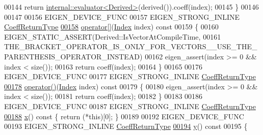 \begin{DoxyCode}
00144       \textcolor{keywordflow}{return} \hyperlink{struct_eigen_1_1internal_1_1evaluator}{internal::evaluator<Derived>}(derived()).coeff(index);
00145     \}
00146 
00147 
00156     EIGEN\_DEVICE\_FUNC
00157     EIGEN\_STRONG\_INLINE \hyperlink{class_eigen_1_1internal_1_1_tensor_lazy_evaluator_writable}{CoeffReturnType}
\hyperlink{group___core___module_ad26422dfa7b2bf859d4304663c36de10}{00158}     \hyperlink{group___core___module_ad26422dfa7b2bf859d4304663c36de10}{operator[]}(\hyperlink{group___core___module_a554f30542cc2316add4b1ea0a492ff02}{Index} index)\textcolor{keyword}{ const}
00159 \textcolor{keyword}{    }\{
00160       EIGEN\_STATIC\_ASSERT(Derived::IsVectorAtCompileTime,
00161                           THE\_BRACKET\_OPERATOR\_IS\_ONLY\_FOR\_VECTORS\_\_USE\_THE\_PARENTHESIS\_OPERATOR\_INSTEAD)
00162       eigen\_assert(index >= 0 && index < size());
00163       \textcolor{keywordflow}{return} coeff(index);
00164     \}
00165 
00176     EIGEN\_DEVICE\_FUNC
00177     EIGEN\_STRONG\_INLINE \hyperlink{class_eigen_1_1internal_1_1_tensor_lazy_evaluator_writable}{CoeffReturnType}
\hyperlink{group___core___module_a679c7e69917baa1abf2c2f82725ae470}{00178}     \hyperlink{group___core___module_a679c7e69917baa1abf2c2f82725ae470}{operator()}(\hyperlink{group___core___module_a554f30542cc2316add4b1ea0a492ff02}{Index} index)\textcolor{keyword}{ const}
00179 \textcolor{keyword}{    }\{
00180       eigen\_assert(index >= 0 && index < size());
00181       \textcolor{keywordflow}{return} coeff(index);
00182     \}
00183 
00186     EIGEN\_DEVICE\_FUNC
00187     EIGEN\_STRONG\_INLINE \hyperlink{class_eigen_1_1internal_1_1_tensor_lazy_evaluator_writable}{CoeffReturnType}
\hyperlink{group___core___module_a36fb246141b6ea5ab5289d7eb6afdf6e}{00188}     \hyperlink{group___core___module_a36fb246141b6ea5ab5289d7eb6afdf6e}{x}()\textcolor{keyword}{ const }\{ \textcolor{keywordflow}{return} (*\textcolor{keyword}{this})[0]; \}
00189 
00192     EIGEN\_DEVICE\_FUNC
00193     EIGEN\_STRONG\_INLINE \hyperlink{class_eigen_1_1internal_1_1_tensor_lazy_evaluator_writable}{CoeffReturnType}
\hyperlink{group___core___module_af2cb257225cf4348136a37fa9333ccda}{00194}     \hyperlink{group___core___module_af2cb257225cf4348136a37fa9333ccda}{y}()\textcolor{keyword}{ const}
00195 \textcolor{keyword}{    }\{

\end{DoxyCode}
